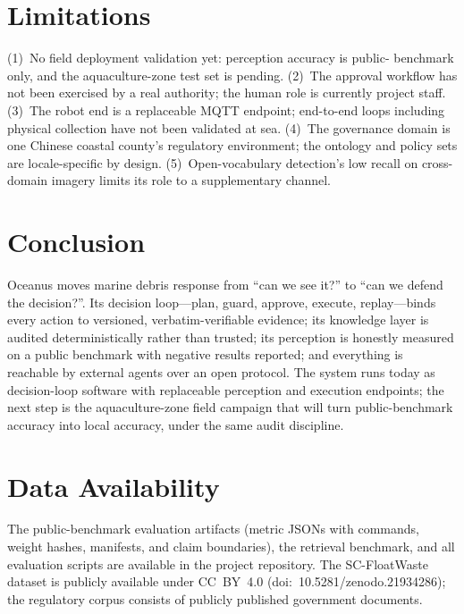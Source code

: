 \documentclass[conference]{IEEEtran}
\begin{document}
\section{Limitations}
(1)~No field deployment validation yet: perception accuracy is public-
benchmark only, and the aquaculture-zone test set is pending. (2)~The
approval workflow has not been exercised by a real authority; the human
role is currently project staff. (3)~The robot end is a replaceable MQTT
endpoint; end-to-end loops including physical collection have not been
validated at sea. (4)~The governance domain is one Chinese coastal county's
regulatory environment; the ontology and policy sets are locale-specific by
design. (5)~Open-vocabulary detection's low recall on cross-domain imagery
limits its role to a supplementary channel.

\section{Conclusion}
Oceanus moves marine debris response from ``can we see it?'' to ``can we
defend the decision?''. Its decision loop---plan, guard, approve, execute,
replay---binds every action to versioned, verbatim-verifiable evidence;
its knowledge layer is audited deterministically rather than trusted; its
perception is honestly measured on a public benchmark with negative results
reported; and everything is reachable by external agents over an open
protocol. The system runs today as decision-loop software with replaceable
perception and execution endpoints; the next step is the aquaculture-zone
field campaign that will turn public-benchmark accuracy into local
accuracy, under the same audit discipline.

\section*{Data Availability}
The public-benchmark evaluation artifacts (metric JSONs with commands,
weight hashes, manifests, and claim boundaries), the retrieval benchmark,
and all evaluation scripts are available in the project repository. The
SC-FloatWaste dataset is publicly available under CC~BY~4.0
(doi:~10.5281/zenodo.21934286); the regulatory corpus consists of publicly
published government documents.
\end{document}
